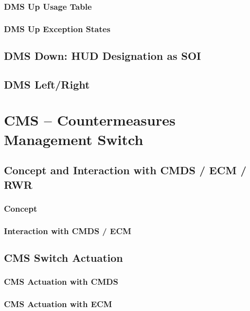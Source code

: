 \documentclass[11pt,a4paper]{article}
\begin{document}
\subsubsection{DMS Up Usage Table}

\subsubsection{DMS Up Exception States}

\subsection{DMS Down: HUD Designation as SOI}

\subsection{DMS Left/Right}

\section{CMS -- Countermeasures Management Switch}

\subsection{Concept and Interaction with CMDS / ECM / RWR}

\subsubsection{Concept}

\subsubsection{Interaction with CMDS / ECM}

\subsection{CMS Switch Actuation}

\subsubsection{CMS Actuation with CMDS}

\subsubsection{CMS Actuation with ECM}
\end{document}
